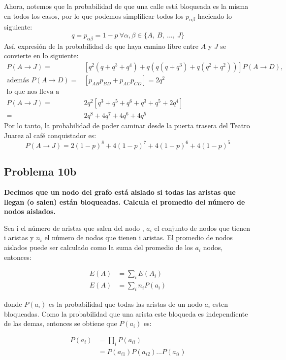 Ahora, notemos que la probabilidad de que una calle está bloqueada es la misma en todos los casos, por lo que podemos simplificar todos los $p_{\alpha\beta}$ haciendo lo siguiente:
$$
    q = p_{\alpha\beta}=1-p\ \forall\alpha, \beta\in\{A,\ B,\ ...,\ J\}
$$
Así, expresión de la probabilidad de que haya camino libre entre $A$ y $J$ se convierte en lo siguiente:
\begin{align*}
    P(A\rightarrow J) =                & \left[ q^2(q+q^3+q^4) +q(q(q+q^3)+q(q^2+q^2))\right]P(A\rightarrow D), \\
    \text{además } P(A\rightarrow D) = & \left[p_{AB}p_{BD}+p_{AC}p_{CD}\right] = 2q^2                          \\
    \text{lo que nos lleva a }         &                                                                        \\
    P(A\rightarrow J) =                & 2q^2\left[ q^3+q^5 + q^6 + q^3+ q^5+ 2q^4\right]                       \\
    =                                  & 2q^8+4q^7+4q^6+4q^5
\end{align*}
Por lo tanto, la probabilidad de poder caminar desde la puerta trasera del Teatro Juarez al café conquistador es:
$$
    P(A\rightarrow J) = 2(1-p)^8+4(1-p)^7+4(1-p)^6+4(1-p)^5
$$
\subsection*{Problema 10b}
\textbf{Decimos que un nodo del grafo está aislado si todas las aristas que llegan (o salen) están bloqueadas. Calcula el promedio del número de nodos aislados.}

Sea i el número de aristas que salen del nodo , $a_i$ el conjunto de  nodos que tienen i aristas y $n_i$ el número de nodos que tienen i aristas. El promedio de nodos aislados puede ser calculado como la suma del promedio de los $a_i$ nodos, entonces:

\begin{align}
    E(A) & = \sum_i E(A_i)     \nonumber     \\
    E(A) & = \sum_i n_i P(a_i) \label{eq:ea}
\end{align}

donde $P(a_i)$ es la probabilidad que todas las aristas de un nodo $a_i$ esten bloqueadas. Como la probabilidad que una arista este bloqueda es independiente de las demas, entonces se obtiene que $P(a_i)$ es:

\begin{align*}
    P(a_i) & = \prod_i P(a_{ii})                \\
           & =P(a_{i1})P(a_{i2})\dots P(a_{ii})
\end{align*}

